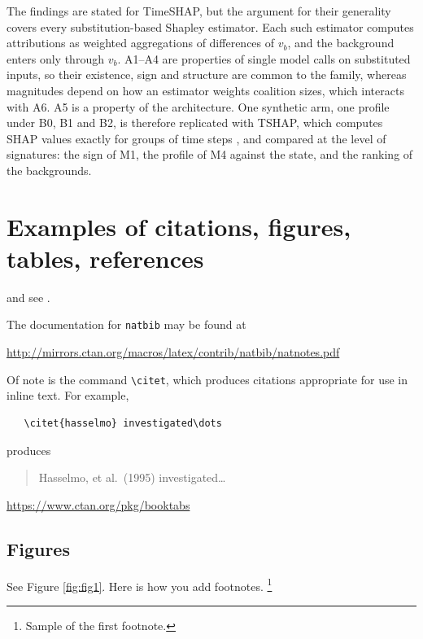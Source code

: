 \documentclass{article}
\begin{document}
The findings are stated for TimeSHAP, but the argument for their generality covers every substitution-based Shapley estimator. Each such estimator computes attributions as weighted aggregations of differences of $v_b$, and the background enters only through $v_b$. A1--A4 are properties of single model calls on substituted inputs, so their existence, sign and structure are common to the family, whereas magnitudes depend on how an estimator weights coalition sizes, which interacts with A6. A5 is a property of the architecture. One synthetic arm, one profile under B0, B1 and B2, is therefore replicated with TSHAP, which computes SHAP values exactly for groups of time steps \citep{nguyen2025tshap}, and compared at the level of signatures: the sign of M1, the profile of M4 against the state, and the ranking of the backgrounds.


\section{Examples of citations, figures, tables, references}
\label{sec:others}
\lipsum[8] \cite{kour2014real,kour2014fast} and see \cite{hadash2018estimate}.

The documentation for \verb+natbib+ may be found at
\begin{center}
  \url{http://mirrors.ctan.org/macros/latex/contrib/natbib/natnotes.pdf}
\end{center}
Of note is the command \verb+\citet+, which produces citations
appropriate for use in inline text.  For example,
\begin{verbatim}
   \citet{hasselmo} investigated\dots
\end{verbatim}
produces
\begin{quote}
  Hasselmo, et al.\ (1995) investigated\dots
\end{quote}

\begin{center}
  \url{https://www.ctan.org/pkg/booktabs}
\end{center}


\subsection{Figures}
\lipsum[10] 
See Figure \ref{fig:fig1}. Here is how you add footnotes. \footnote{Sample of the first footnote.}
\lipsum[11] 
\end{document}
